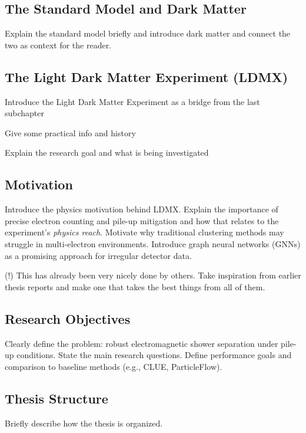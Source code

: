 

\subsection{The Standard Model and Dark Matter}

Explain the standard model briefly and introduce dark matter and connect the two as context for the reader.

\subsection{The Light Dark Matter Experiment (LDMX)}

Introduce the Light Dark Matter Experiment as a bridge from the last subchapter

Give some practical info and history

Explain the research goal and what is being investigated


\newpage

\subsection{Motivation}
Introduce the physics motivation behind LDMX.
Explain the importance of precise electron counting and pile-up mitigation and how that relates to the experiment's \textit{physics reach}.
Motivate why traditional clustering methods may struggle in multi-electron environments.
Introduce graph neural networks (GNNs) as a promising approach for irregular detector data.

(!) This has already been very nicely done by others. Take inspiration from earlier thesis reports and make one that takes the best things from all of them.

\subsection{Research Objectives}
Clearly define the problem: robust electromagnetic shower separation under pile-up conditions.
State the main research questions.
Define performance goals and comparison to baseline methods (e.g., CLUE, ParticleFlow).

\subsection{Thesis Structure}
Briefly describe how the thesis is organized.




